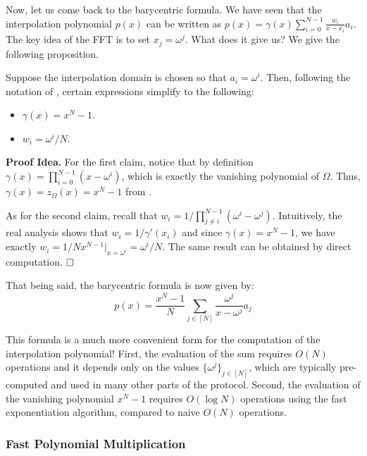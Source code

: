 \documentclass[../../book.tex]{subfiles}
\begin{document}
Now, let us come back to the barycentric formula. We have seen that the
interpolation polynomial $p(x)$ can be written as $p(x) = \gamma(x) 
\sum_{i=0}^{N-1} \frac{w_i}{x-x_i}a_i$. The key idea of the FFT is to
set $x_j = \omega^j$. What does it give us? We give the following proposition.

\begin{proposition}
    Suppose the interpolation domain is chosen so that $a_i = \omega^i$. Then, 
    following the notation of , certain expressions 
    simplify to the following:
    \begin{itemize}
        \item $\gamma(x) = x^N-1$.
        \item $w_i = \omega^i/N$.
    \end{itemize}
\end{proposition}

\textbf{Proof Idea.} For the first claim, notice that
by definition $\gamma(x) = \prod_{i=0}^{N-1}(x-\omega^i)$, which is exactly 
the vanishing polynomial of $\Omega$. Thus, $\gamma(x) = z_{\Omega}(x) = x^N-1$
from . 

As for the second claim, recall that $w_i = 1/\prod_{j \neq
i}^{N-1}(\omega^i-\omega^j)$. Intuitively, the real analysis
shows that $w_i = 1/\gamma'(x_i)$ and since $\gamma(x)=x^N-1$, we 
have exactly $w_i = 1/Nx^{N-1}\Big|_{x=\omega^i}=\omega^i/N$. The same 
result can be obtained by direct computation. $\hfill\Box$

That being said, the barycentric formula is now given by:
\begin{equation*}
    p(x) = \frac{x^N-1}{N} \sum_{j \in [N]} \frac{\omega^j}{x-\omega^j}a_j
\end{equation*}

This formula is a much more convenient form for the computation of the
interpolation polynomial! First, the evaluation of the sum requires $O(N)$
operations and it depends only on the values $\{\omega^j\}_{j \in [N]}$,
which are typically pre-computed and used in many other parts of the protocol.
Second, the evaluation of the vanishing polynomial $x^N-1$ requires $O(\log N)$
operations using the fast exponentiation algorithm, compared to naive 
$O(N)$ operations. 

\subsubsection{Fast Polynomial Multiplication}\label{subsec:fast-poly-mul}
\end{document}
